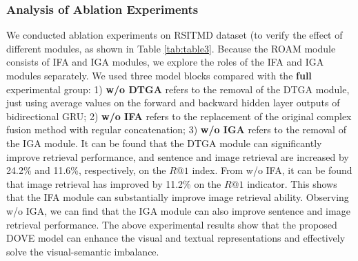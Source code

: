 \documentclass[journal]{IEEEtran}
\begin{document}
\subsubsection{Analysis of Ablation Experiments}
We conducted ablation experiments on RSITMD dataset (to verify the effect of different modules, as shown in Table \ref{tab:table3}. Because the ROAM module consists of IFA and IGA modules, we explore the roles of the IFA and IGA modules separately. We used three model blocks compared with the \textbf{full} experimental group: 1) \textbf{w/o DTGA} refers to the removal of the DTGA module, just using average values on the forward and backward hidden layer outputs of bidirectional GRU; 2) \textbf{w/o IFA} refers to the replacement of the original complex fusion method with regular concatenation; 3) \textbf{w/o IGA} refers to the removal of the IGA module. It can be found that the DTGA module can significantly improve retrieval performance, and sentence and image retrieval are increased by 24.2\% and 11.6\%, respectively, on the $R@1$ index. From w/o IFA, it can be found that image retrieval has improved by 11.2\% on the $R@1$ indicator. This shows that the IFA module can substantially improve image retrieval ability. Observing w/o IGA, we can find that the IGA module can also improve sentence and image retrieval performance. The above experimental results show that the proposed DOVE model can enhance the visual and textual representations and effectively solve the visual-semantic imbalance.
\begin{table}[t]
\renewcommand\arraystretch{1.5}
\caption{Ablation experiments on RSITMD test set.}
\label{tab:table3}
\end{table}
\end{document}
